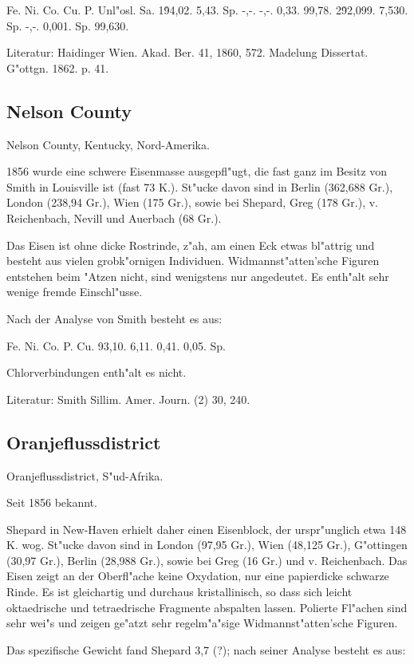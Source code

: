 \documentclass[a4paper, 11pt, oneside]{article}
\begin{document}
Fe. Ni. Co. Cu. P. Unl"osl. Sa.  
1\. 94,02. 5,43. Sp. -,-. -,-. 0,33. 99,78.  
2\. 92,099. 7,530. Sp. -,-. 0,001. Sp. 99,630.

Literatur: Haidinger Wien. Akad. Ber. 41, 1860, 572. Madelung Dissertat. G"ottgn. 1862. p. 41.

\subsection{Nelson County}

Nelson County, Kentucky, Nord-Amerika.

1856 wurde eine schwere Eisenmasse ausgepfl"ugt, die fast ganz im Besitz von Smith in Louisville ist (fast 73 K.). St"ucke davon sind in Berlin (362,688 Gr.), London (238,94 Gr.), Wien (175 Gr.), sowie bei Shepard, Greg (178 Gr.), v. Reichenbach, Nevill und Auerbach (68 Gr.).

Das Eisen ist ohne dicke Rostrinde, z"ah, am einen Eck etwas bl"attrig und besteht aus vielen grobk"ornigen Individuen. Widmannst"atten'sche Figuren entstehen beim "Atzen nicht, sind wenigstens nur angedeutet. Es enth"alt sehr wenige fremde Einschl"usse.

Nach der Analyse von Smith besteht es aus:

Fe. Ni. Co. P. Cu.  
93,10. 6,11. 0,41. 0,05. Sp.

Chlorverbindungen enth"alt es nicht.

Literatur: Smith Sillim. Amer. Journ. (2) 30, 240.

\subsection{Oranjeflussdistrict}

Oranjeflussdistrict, S"ud-Afrika.

Seit 1856 bekannt.

Shepard in New-Haven erhielt daher einen Eisenblock, der urspr"unglich etwa 148 K. wog. St"ucke davon sind in London (97,95 Gr.), Wien (48,125 Gr.), G"ottingen (30,97 Gr.), Berlin (28,988 Gr.), sowie bei Greg (16 Gr.) und v. Reichenbach. Das Eisen zeigt an der Oberfl"ache keine Oxydation, nur eine papierdicke schwarze Rinde. Es ist gleichartig und durchaus kristallinisch, so dass sich leicht oktaedrische und tetraedrische Fragmente abspalten lassen. Polierte Fl"achen sind sehr wei"s und zeigen ge"atzt sehr regelm"a"sige Widmannst"atten'sche Figuren.

Das spezifische Gewicht fand Shepard 3,7 (?); nach seiner Analyse besteht es aus:
\end{document}
